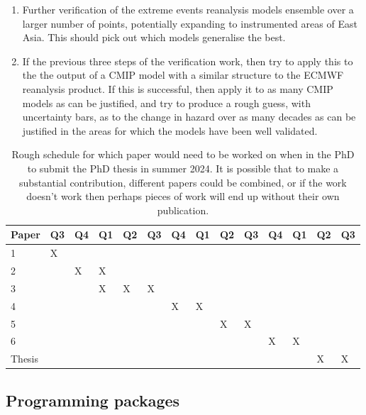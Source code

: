 \documentclass[usenames, dvipsnames]{article}      %
\begin{document}
\begin{enumerate}
    \item Further verification of the extreme events reanalysis models 
        ensemble over a larger number of points, potentially expanding to
         instrumented areas of East Asia. This should pick out which
         models generalise the best.
         
    \item If the previous three steps of the verification work, then 
        try to apply this to the the output of a CMIP model
        with a similar structure to the ECMWF reanalysis product.
        If this is successful, 
        then apply it to as many CMIP models as can be justified, 
        and try to produce a rough guess, with uncertainty bars, 
        as to the change in hazard over as many decades as 
        can be justified in the areas for which the models have been 
        well validated.
        
\end{enumerate}

\begin{table}[htb!]
    \centering
    \begin{tabular}{llllllllllllll}
    \hline \hline
    \textbf{Paper} & Q3 & Q4 & Q1 & Q2 & Q3 & Q4 & Q1 
    & Q2 & Q3 & Q4 & Q1 & Q2 & Q3 \\
    \hline
        1 & X   \\
        2 & & X & X \\
        3 & & & X & X & X \\
        4 & & &  &  &  & X & X &\\
        5 & & &  &  &  &  & &  X & X & \\
        6 & & &  &  &  &  & &   &  & X & X &\\
        \hline
        Thesis &&&& &&&& &&&& X & X\\
        \hline \hline
    \end{tabular}
    \caption{Rough schedule for which paper would need 
            to be worked on when in the PhD to submit 
            the PhD thesis in summer 2024. It is possible
            that to make a substantial contribution,
            different papers could be combined, or if the work 
            doesn't work then perhaps pieces of work will end up
            without their own publication.}
    \label{tab:schedule}
\end{table}

\subsection{Programming packages}
\end{document}
